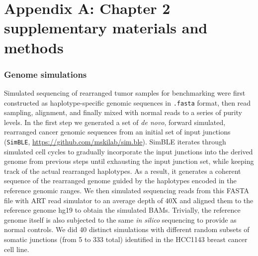 \documentclass[phd,tocprelim]{cornell}
\newcommand{\ttt}[1]{\texttt{#1}}
\begin{document}





\appendix

\chapter*{Appendix A: Chapter 2 supplementary materials and methods} \label{app:a}
\subsection*{Genome simulations}
Simulated sequencing of rearranged tumor samples for benchmarking were first constructed as haplotype-specific genomic sequences in \ttt{.fasta} format, then read sampling, alignment, and finally mixed with normal reads to a series of purity levels. In the first step we generated a set of \textit{de novo}, forward simulated, rearranged cancer genomic sequences from an initial set of input junctions (\texttt{SimBLE}, \url{https://github.com/mskilab/sim.ble}). SimBLE iterates through simulated cell cycles to gradually incorporate the input junctions into the derived genome from previous steps until exhausting the input junction set, while keeping track of the actual rearranged haplotypes. As a result, it generates a coherent sequence of the rearranged genome guided by the haplotypes encoded in the reference genomic ranges. We then simulated sequencing reads from this FASTA file with ART read simulator \cite{Huang2012-zn} to an average depth of 40X and aligned them to the reference genome hg19 to obtain the simulated BAMs. Trivially, the reference genome itself is also subjected to the same \textit{in silico} sequencing to provide as normal controls. We did 40 distinct simulations with different random subsets of somatic junctions (from 5 to 333 total) identified in the HCC1143 breast cancer cell line. 
\end{document}
